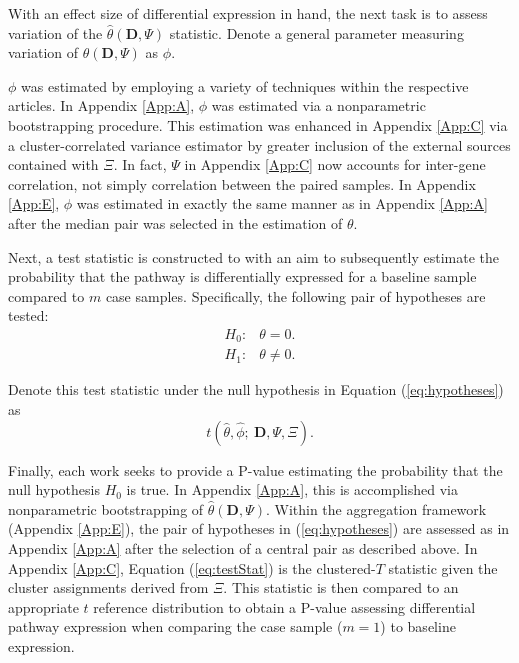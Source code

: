 With an effect size of differential expression in hand, the next task is to assess variation of the $\hat{\theta}(\mathbf{D}, \Psi)$ statistic. Denote a general parameter measuring variation of $\hat{\theta}(\mathbf{D}, \Psi)$ as $\phi$.


$\phi$ was estimated by employing a variety of techniques within the respective articles. In Appendix \ref{App:A}, $\phi$ was estimated via a nonparametric bootstrapping procedure. This estimation was enhanced in Appendix \ref{App:C} via a cluster-correlated variance estimator by greater inclusion of the external sources contained with $\Xi$. In fact, $\Psi$ in Appendix \ref{App:C} now accounts for inter-gene correlation, not simply correlation between the paired samples. In Appendix \ref{App:E}, $\phi$ was estimated in exactly the same manner as in Appendix \ref{App:A} after the median pair was selected in the estimation of $\theta$.

Next, a test statistic is constructed to with an aim to subsequently estimate the probability that the pathway is differentially expressed for a baseline sample compared to $m$ case samples. Specifically, the following pair of hypotheses are tested:
\begin{equation}
  \label{eq:hypotheses}
\begin{array}{rl} \tag{3}
  H_{0}: & \theta = 0. \\
  H_{1}: & \theta \neq 0.
\end{array}
\end{equation}

\noindent \noindent Denote this test statistic under the null hypothesis in Equation (\ref{eq:hypotheses}) as
\begin{equation}
\label{eq:testStat}
t(\hat{\theta},\hat{\phi};~\mathbf{D},\Psi,\Xi). \tag{4}
\end{equation}

Finally, each work seeks to provide a P-value estimating the probability that the null hypothesis $H_{0}$ is true. In Appendix \ref{App:A}, this is accomplished via nonparametric bootstrapping of $\hat{\theta}(\mathbf{D}, \Psi)$. Within the aggregation framework (Appendix \ref{App:E}), the pair of hypotheses in (\ref{eq:hypotheses}) are assessed as in Appendix \ref{App:A} after the selection of a central pair as described above. In Appendix \ref{App:C}, Equation (\ref{eq:testStat}) is the clustered-$T$ statistic given the cluster assignments derived from $\Xi$. This statistic is then compared to an appropriate $t$ reference distribution to obtain a P-value assessing differential pathway expression when comparing the case sample ($m=1$) to baseline expression. 
